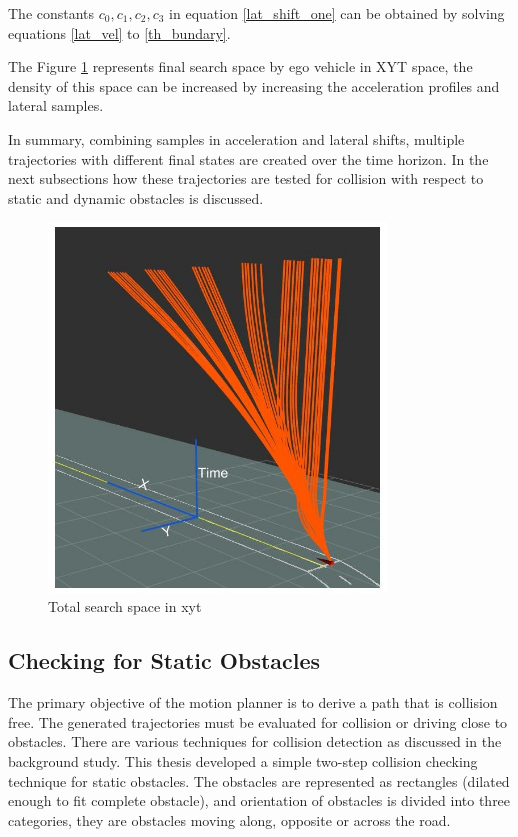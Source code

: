 The constants $ { c_0,c_1,c_2,c_3} $ in equation \ref{lat_shift_one} can be obtained by solving equations \ref{lat_vel} to \ref{th_bundary}.

The Figure \ref{searchspace} represents final search space by ego vehicle in XYT space, the density of this space can be increased by increasing the acceleration profiles and lateral samples. 


In summary, combining samples in acceleration and lateral shifts, multiple trajectories with different final states are created over the time horizon. In the next subsections how these trajectories are tested for collision with respect to static and dynamic obstacles is discussed. 

 \begin{figure}
	\centering
	\includegraphics[width=0.8\textwidth]{Images/concept/searchspace2.jpg}
	\caption{Total search space in xyt}
	\label{searchspace}
\end{figure}


\subsection{Checking for Static Obstacles} \label{osbtacle_check_satic}
The primary objective of the motion planner is to derive a path that is collision free. The generated trajectories must be evaluated for collision or driving close to obstacles. There are various techniques for collision detection as discussed in the background study. This thesis developed a simple two-step collision checking technique for static obstacles. The obstacles are represented as rectangles (dilated enough to fit complete obstacle), and orientation of obstacles is divided into three categories, they are obstacles moving along, opposite or across the road. 

